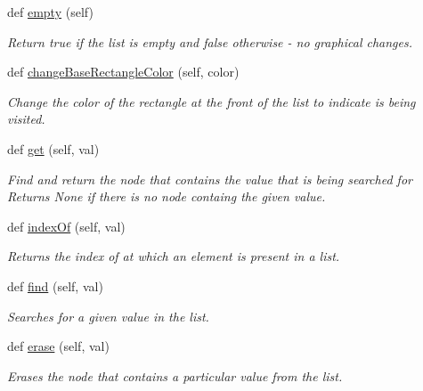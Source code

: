\begin{DoxyCompactItemize}
\mbox{\label{class_singly_linked_list_1_1_singly_linked_list_a724e0a860fe1047e11c285dc533f567c}} 
def \hyperlink{class_singly_linked_list_1_1_singly_linked_list_a724e0a860fe1047e11c285dc533f567c}{empty} (self)
\begin{DoxyCompactList}\small\item\em Return true if the list is empty and false otherwise -\/ no graphical changes. \end{DoxyCompactList}\item 
def \hyperlink{class_singly_linked_list_1_1_singly_linked_list_a83ac65fabad4d24148ee485a8c4f372f}{change\+Base\+Rectangle\+Color} (self, color)
\begin{DoxyCompactList}\small\item\em Change the color of the rectangle at the front of the list to indicate is being visited. \end{DoxyCompactList}\item 
def \hyperlink{class_singly_linked_list_1_1_singly_linked_list_a81b05adc8e8bf959afe66e1923e4e474}{get} (self, val)
\begin{DoxyCompactList}\small\item\em Find and return the node that contains the value that is being searched for Returns None if there is no node containg the given value. \end{DoxyCompactList}\item 
def \hyperlink{class_singly_linked_list_1_1_singly_linked_list_a17fbbbcfb0ff4a47c90c2d0ac00b37a5}{index\+Of} (self, val)
\begin{DoxyCompactList}\small\item\em Returns the index of at which an element is present in a list. \end{DoxyCompactList}\item 
def \hyperlink{class_singly_linked_list_1_1_singly_linked_list_a849c6542d4c83898efafc9bc1e0734e1}{find} (self, val)
\begin{DoxyCompactList}\small\item\em Searches for a given value in the list. \end{DoxyCompactList}\item 
def \hyperlink{class_singly_linked_list_1_1_singly_linked_list_a994d4a1f5408fff85a372dd5d9c772fc}{erase} (self, val)
\begin{DoxyCompactList}\small\item\em Erases the node that contains a particular value from the list. \end{DoxyCompactList}\item 

\end{DoxyCompactItemize}
